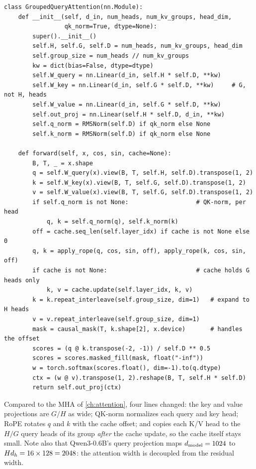 \begin{lstlisting}[caption={Grouped-query attention with QK-norm, RoPE and an optional KV cache.},label={lst:modern:gqa}]
class GroupedQueryAttention(nn.Module):
    def __init__(self, d_in, num_heads, num_kv_groups, head_dim,
                 qk_norm=True, dtype=None):
        super().__init__()
        self.H, self.G, self.D = num_heads, num_kv_groups, head_dim
        self.group_size = num_heads // num_kv_groups
        kw = dict(bias=False, dtype=dtype)
        self.W_query = nn.Linear(d_in, self.H * self.D, **kw)
        self.W_key = nn.Linear(d_in, self.G * self.D, **kw)     # G, not H, heads
        self.W_value = nn.Linear(d_in, self.G * self.D, **kw)
        self.out_proj = nn.Linear(self.H * self.D, d_in, **kw)
        self.q_norm = RMSNorm(self.D) if qk_norm else None
        self.k_norm = RMSNorm(self.D) if qk_norm else None

    def forward(self, x, cos, sin, cache=None):
        B, T, _ = x.shape
        q = self.W_query(x).view(B, T, self.H, self.D).transpose(1, 2)
        k = self.W_key(x).view(B, T, self.G, self.D).transpose(1, 2)
        v = self.W_value(x).view(B, T, self.G, self.D).transpose(1, 2)
        if self.q_norm is not None:                   # QK-norm, per head
            q, k = self.q_norm(q), self.k_norm(k)
        off = cache.seq_len(self.layer_idx) if cache is not None else 0
        q, k = apply_rope(q, cos, sin, off), apply_rope(k, cos, sin, off)
        if cache is not None:                         # cache holds G heads only
            k, v = cache.update(self.layer_idx, k, v)
        k = k.repeat_interleave(self.group_size, dim=1)   # expand to H heads
        v = v.repeat_interleave(self.group_size, dim=1)
        mask = causal_mask(T, k.shape[2], x.device)       # handles the offset
        scores = (q @ k.transpose(-2, -1)) / self.D ** 0.5
        scores = scores.masked_fill(mask, float("-inf"))
        w = torch.softmax(scores.float(), dim=-1).to(q.dtype)
        ctx = (w @ v).transpose(1, 2).reshape(B, T, self.H * self.D)
        return self.out_proj(ctx)
\end{lstlisting}

Compared to the MHA of \cref{ch:attention}, four lines changed: the key and value projections are
$G/H$ as wide; QK-norm normalizes each query and key head; RoPE rotates $q$ and $k$ with the cache
offset; and  copies each K/V head to the $H/G$ query heads of its group
\emph{after} the cache update, so the cache itself stays small. Note also that Qwen3-0.6B's query
projection maps $d_{\text{model}}=1024$ to $Hd_{h}=16\times128=2048$: the attention width is decoupled from
the residual width.

